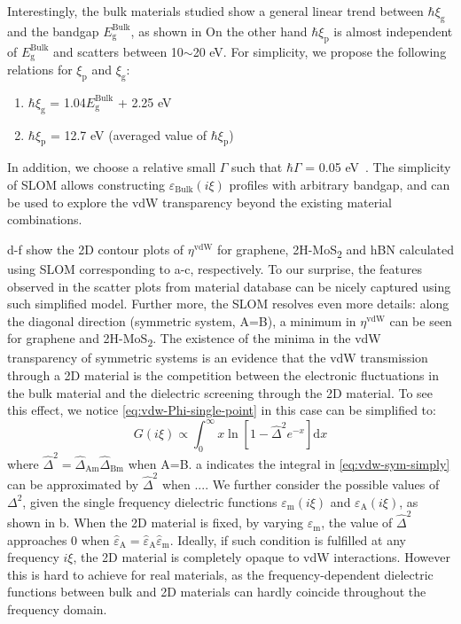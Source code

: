 Interestingly, the bulk materials studied show a general linear trend
between \(\hbar \xi_{\mathrm{g}}\) and the bandgap
\(E_{\mathrm{g}}^{\mathrm{Bulk}}\), as shown in   On the other hand \(\hbar \xi_{\mathrm{p}}\) is almost
independent of \(E_{\mathrm{g}}^{\mathrm{Bulk}}\) and scatters between
10\(\sim\)20 eV.  For simplicity, we propose the following relations
for \(\xi_{\mathrm{p}}\) and \(\xi_{\mathrm{g}}\):
\begin{enumerate}
\item \(\hbar \xi_{\mathrm{g}}\) = 1.04\(E_{\mathrm{g}}^{\mathrm{Bulk}}\) + 2.25 eV
\item \(\hbar \xi_{\mathrm{p}}\) = 12.7 eV (averaged value of \(\hbar
   \xi_{\mathrm{p}}\))
 \end{enumerate}
 In addition, we choose a relative small $\Gamma$ such that
 $\hbar \Gamma$ = 0.05 eV~.  The simplicity of SLOM
 allows constructing $\varepsilon_{\mathrm{Bulk}}(i \xi)$ profiles
 with arbitrary bandgap, and can be used to explore the vdW
 transparency beyond the existing material combinations.
 

d-f show the 2D
contour plots of $\eta^{\mathrm{vdW}}$ for graphene,
2H-MoS\textsubscript{2} and hBN calculated using SLOM corresponding
to a-c, respectively.
%
To our surprise, the features observed in the scatter plots from
material database can be nicely captured using such simplified
model.
%
Further more, the SLOM resolves even more details: along the diagonal
direction (\ie symmetric system, A=B), a minimum in
$\eta^{\mathrm{vdW}}$ can be seen for graphene and
2H-MoS\textsubscript{2}.
%
The existence of the minima in the vdW transparency of symmetric
systems is an evidence that the vdW transmission through a 2D material
is the competition between the electronic fluctuations in the bulk
material and the dielectric screening through the 2D material.  To see
this effect, we notice \autoref{eq:vdw-Phi-single-point} in this case can be simplified to:
\begin{equation}
  \label{eq:vdw-sym-simply}
  G(i \xi) \propto \int_{0}^{\infty} x \ln \left[ 1 - \hat{\Delta}^{2} e^{-x}\right] \mathrm{d}x
\end{equation}
where
$\hat{\Delta}^{2} =
\hat{\Delta}_{\mathrm{Am}}\hat{\Delta}_{\mathrm{Bm}}$ when A=B.
%
a indicates the integral in
\autoref{eq:vdw-sym-simply} can be approximated by $\hat{\Delta}^{2}$
when .... We further consider the
possible values of \(\Delta^{2}\), given the single frequency
dielectric functions \(\varepsilon_{\mathrm{m}}(i \xi)\) and
\(\varepsilon_{\mathrm{A}}(i \xi)\), as shown in b.
When the 2D material is fixed, by varying
\(\varepsilon_{\mathrm{m}}\), the value of \(\hat{\Delta}^{2}\)
approaches 0 when
\(\hat{\varepsilon}_{\mathrm{A}} = \hat{\varepsilon}_{\mathrm{A}}
\hat{\varepsilon}_{\mathrm{m}}\). Ideally, if such condition is
fulfilled at any frequency \(i\xi\), the 2D material is completely
opaque to vdW interactions. However this is hard to achieve for real
materials, as the frequency-dependent dielectric functions between
bulk and 2D materials can hardly coincide throughout the frequency
domain. 


